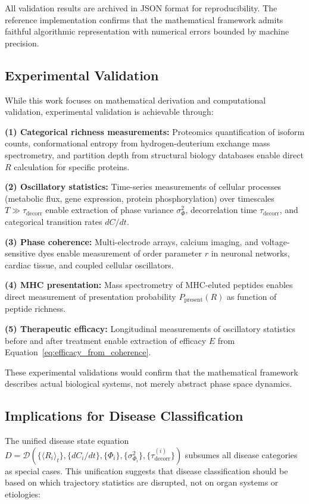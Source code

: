 \documentclass[11pt,twocolumn,a4paper]{article}
\theoremstyle{definition}
\theoremstyle{remark}
\newcommand{\taudecorr}{\tau_{\mathrm{decorr}}}
\begin{document}
All validation results are archived in JSON format for reproducibility. The reference implementation confirms that the mathematical framework admits faithful algorithmic representation with numerical errors bounded by machine precision.

\subsection{Experimental Validation}

While this work focuses on mathematical derivation and computational validation, experimental validation is achievable through:

\textbf{(1) Categorical richness measurements:} Proteomics quantification of isoform counts, conformational entropy from hydrogen-deuterium exchange mass spectrometry, and partition depth from structural biology databases enable direct $R$ calculation for specific proteins.

\textbf{(2) Oscillatory statistics:} Time-series measurements of cellular processes (metabolic flux, gene expression, protein phosphorylation) over timescales $T \gg \taudecorr$ enable extraction of phase variance $\sigma_\Phi^2$, decorrelation time $\taudecorr$, and categorical transition rates $dC/dt$.

\textbf{(3) Phase coherence:} Multi-electrode arrays, calcium imaging, and voltage-sensitive dyes enable measurement of order parameter $r$ in neuronal networks, cardiac tissue, and coupled cellular oscillators.

\textbf{(4) MHC presentation:} Mass spectrometry of MHC-eluted peptides enables direct measurement of presentation probability $P_{\mathrm{present}}(R)$ as function of peptide richness.

\textbf{(5) Therapeutic efficacy:} Longitudinal measurements of oscillatory statistics before and after treatment enable extraction of efficacy $E$ from Equation~\eqref{eq:efficacy_from_coherence}.

These experimental validations would confirm that the mathematical framework describes actual biological systems, not merely abstract phase space dynamics.

\subsection{Implications for Disease Classification}

The unified disease state equation $D = \mathcal{D}(\{\langle R_i\rangle_t\}, \{dC_i/dt\}, \{\Phi_i\}, \{\sigma_{\Phi_i}^2\}, \{\taudecorr^{(i)}\})$ subsumes all disease categories as special cases. This unification suggests that disease classification should be based on which trajectory statistics are disrupted, not on organ systems or etiologies:
\end{document}
